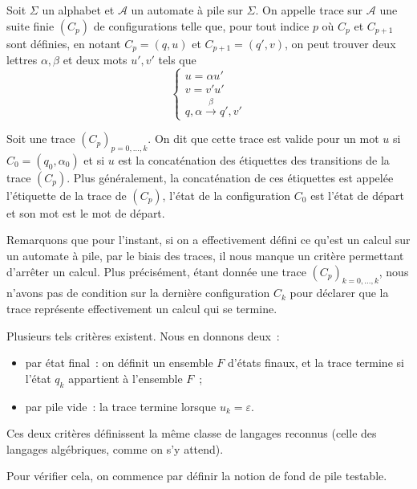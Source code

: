 \begin{definition}
    Soit $\Sigma$ un alphabet et $\mathcal A$ un automate à pile sur $\Sigma$. On
    appelle trace sur $\mathcal A$ une suite finie $(C_p)$ de
    configurations telle que, pour tout indice $p$ où $C_p$ et $C_{p+1}$ sont définies,
    en notant $C_p = (q,u)$ et $C_{p+1} = (q',v)$, on peut trouver deux lettres
    $\alpha,\beta$ et deux mots $u',v'$ tels que
    \[\begin{cases}
        u = \alpha u'\\
        v = v'u'\\
        q,\alpha \xrightarrow \beta q',v'
    \end{cases}\]

    Soit une trace $(C_p)_{p = 0,\ldots,k}$. On dit que cette trace est valide pour un
    mot $u$ si $C_0 = (q_0,\alpha_0)$ et si $u$ est la concaténation des étiquettes des
    transitions de la trace $(C_p)$. Plus généralement, la concaténation de ces
    étiquettes est appelée l'étiquette de la trace de $(C_p)$, l'état de la
    configuration $C_0$ est l'état de départ et son mot est le mot de départ.
\end{definition}

Remarquons que pour l'instant, si on a effectivement défini ce qu'est un calcul sur un
automate à pile, par le biais des traces, il nous manque un critère permettant d'arrêter
un calcul. Plus précisément, étant donnée une trace $(C_p)_{k = 0,\ldots,k}$, nous
n'avons pas de condition sur la dernière configuration $C_k$ pour déclarer que la
trace représente effectivement un calcul qui se termine.

Plusieurs tels critères existent. Nous en donnons deux~:
\begin{itemize}
    \item par état final~: on définit un ensemble $F$ d'états finaux, et la trace
    termine si l'état $q_k$ appartient à l'ensemble $F$~;
    \item par pile vide~: la trace termine lorsque $u_k = \varepsilon$.
\end{itemize}

Ces deux critères définissent la même classe de langages reconnus (celle des langages
algébriques, comme on s'y attend).

Pour vérifier cela, on commence par définir la notion de fond de pile testable.

